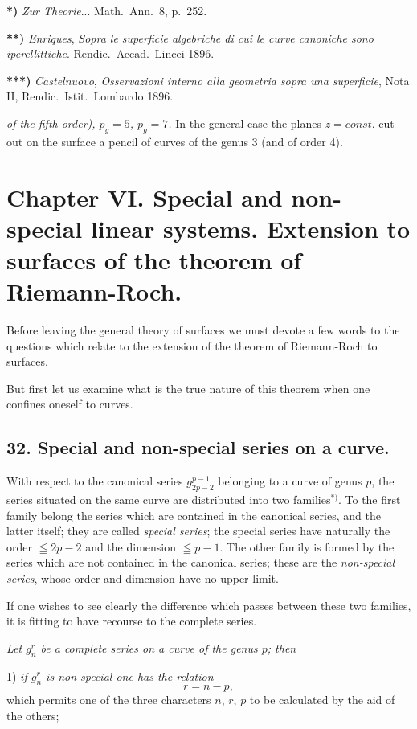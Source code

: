 \documentclass{article}
\begin{document}
\textbf{*)} \emph{Zur Theorie}... Math.\ Ann.\ 8, p.\ 252.

\textbf{**)} \emph{Enriques}, \emph{Sopra le superficie algebriche di cui le curve canoniche sono iperellittiche}. Rendic.\ Accad.\ Lincei 1896.

\textbf{***)} \emph{Castelnuovo}, \emph{Osservazioni interno alla geometria sopra una superficie}, Nota II, Rendic.\ Istit.\ Lombardo 1896.

\emph{of the fifth order), $p_{g} = 5$, $p_{g} = 7$.} In the general case the planes $z = const.$ cut out on the surface a pencil of curves of the genus 3 (and of order 4).

\section*{Chapter VI. Special and non-special linear systems. Extension to surfaces of the theorem of Riemann-Roch.}

Before leaving the general theory of surfaces we must devote a few words to the questions which relate to the extension of the theorem of Riemann-Roch to surfaces.

But first let us examine what is the true nature of this theorem when one confines oneself to curves.

\subsection*{32. Special and non-special series on a curve.}

With respect to the canonical series $g_{2p-2}^{p-1}$ belonging to a curve of genus $p$, the series situated on the same curve are distributed into two families${}^{*)}$. To the first family belong the series which are contained in the canonical series, and the latter itself; they are called \emph{special series}; the special series have naturally the order $\leqq 2p - 2$ and the dimension $\leqq p - 1$. The other family is formed by the series which are not contained in the canonical series; these are the \emph{non-special series}, whose order and dimension have no upper limit.

If one wishes to see clearly the difference which passes between these two families, it is fitting to have recourse to the complete series.

\emph{Let $g_{n}^{r}$ be a complete series on a curve of the genus $p$; then}

1) \emph{if $g_{n}^{r}$ is non-special one has the relation}
\[ r = n - p, \]
which permits one of the three characters $n$, $r$, $p$ to be calculated by the aid of the others;
\end{document}

